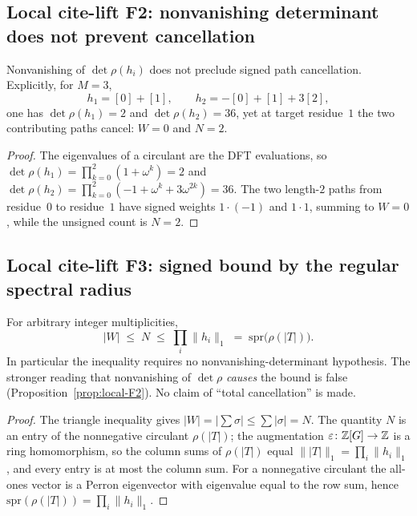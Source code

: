 \subsection{Local cite-lift F2: nonvanishing determinant does not prevent cancellation}
\begin{proposition}\label{prop:local-F2}
Nonvanishing of $\det\rho(h_i)$ does not preclude signed path cancellation. Explicitly, for $M=3$,
\[
h_1=[0]+[1],\qquad h_2=-[0]+[1]+3[2],
\]
one has $\det\rho(h_1)=2$ and $\det\rho(h_2)=36$, yet at target residue~$1$ the two contributing paths cancel: $W=0$ and $N=2$.
\end{proposition}
\begin{proof}
The eigenvalues of a circulant are the DFT evaluations, so $\det\rho(h_1)=\prod_{k=0}^{2}(1+\omega^k)=2$ and $\det\rho(h_2)=\prod_{k=0}^{2}(-1+\omega^k+3\omega^{2k})=36$. The two length-$2$ paths from residue~$0$ to residue~$1$ have signed weights $1\cdot(-1)$ and $1\cdot1$, summing to $W=0$, while the unsigned count is $N=2$.
\end{proof}

\subsection{Local cite-lift F3: signed bound by the regular spectral radius}
\begin{proposition}\label{prop:local-F3}
For arbitrary integer multiplicities,
\[
|W|\;\le\; N\;\le\;\prod_i\|h_i\|_1\;=\;\mathrm{spr}\bigl(\rho(|T|)\bigr).
\]
In particular the inequality requires no nonvanishing-determinant hypothesis. The stronger reading that nonvanishing of $\det\rho$ \emph{causes} the bound is false (Proposition~\ref{prop:local-F2}). No claim of ``total cancellation'' is made.
\end{proposition}
\begin{proof}
The triangle inequality gives $|W|=|\sum\sigma|\le\sum|\sigma|=N$. The quantity $N$ is an entry of the nonnegative circulant $\rho(|T|)$; the augmentation $\varepsilon\colon\mathbb{Z}[G]\to\mathbb{Z}$ is a ring homomorphism, so the column sums of $\rho(|T|)$ equal $\||T|\|_1=\prod_i\|h_i\|_1$, and every entry is at most the column sum. For a nonnegative circulant the all-ones vector is a Perron eigenvector with eigenvalue equal to the row sum, hence $\mathrm{spr}(\rho(|T|))=\prod_i\|h_i\|_1$.
\end{proof}

